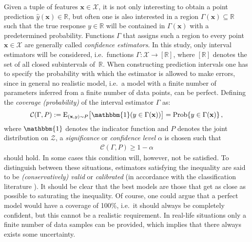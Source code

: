 \documentclass[smallcondensed]{svjour3}
\begin{document}
    Given a tuple of features $\mathbf{x}\in\mathcal{X}$, it is not only interesting to obtain a point prediction $\hat{y}(\mathbf{x})\in\mathbb{R}$, but often one is also interested in a region $\Gamma(\mathbf{x})\subseteq\mathbb{R}$ such that the true response $y\in\mathbb{R}$ will be contained in $\Gamma(\mathbf{x})$ with a predetermined probability. Functions $\Gamma$ that assigns such a region to every point $\mathbf{x}\in\mathcal{X}$ are generally called \textit{confidence estimators}. In this study, only interval estimators will be considered, i.e.\ functions $\Gamma:\mathcal{X}\rightarrow[\mathbb{R}]$, where $[\mathbb{R}]$ denotes the set of all closed subintervals of~$\mathbb{R}$. When constructing prediction intervals one has to specify the probability with which the estimator is allowed to make errors, since in general no realistic model, i.e.\ a model with a finite number of parameters inferred from a finite number of data points, can be perfect. Defining the \textit{coverage (probability)} of the interval estimator $\Gamma$ as:
    \begin{gather}
        \label{coverage}
        \mathcal{C}(\Gamma, P) := \mathrm{E}_{(\mathbf{x},y) \sim P}\big[\mathbbm{1}(y\in \Gamma(\mathbf{x}))\big] = \text{Prob}\{y\in\Gamma(\mathbf{x})\}\,,
    \end{gather}
    where $\mathbbm{1}$ denotes the indicator function and $P$ denotes the joint distribution on $\mathcal{Z}$, a \textit{significance} or \textit{confidence level} $\alpha$ is chosen \cite{faulkenberry1973method,fraser1956tolerance} such that
    \begin{gather}
        \label{calibrated}
        \mathcal{C}(\Gamma,P)\geq 1-\alpha
    \end{gather}
    should hold. In some cases this condition will, however, not be satisfied. To distinguish between these situations, estimators satisfying the inequality are said to be \textit{(conservatively) valid} \cite{cp_all} or \textit{calibrated} (in accordance with the classification literature \cite{guo2017calibration}). It should be clear that the best models are those that get as close as possible to saturating the inequality. Of course, one could argue that a perfect model would have a coverage of 100\%, i.e.\ it should always be completely confident, but this cannot be a realistic requirement. In real-life situations only a finite number of data samples can be provided, which implies that there always exists some uncertainty.
\end{document}
